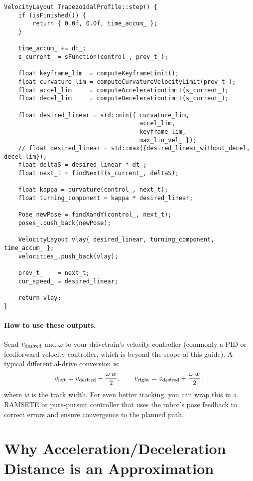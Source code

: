 \documentclass[11pt]{article}
\begin{document}
\begin{lstlisting}
VelocityLayout TrapezoidalProfile::step() {
    if (isFinished()) {
        return { 0.0f, 0.0f, time_accum_ };
    }

    time_accum_ += dt_;
    s_current_ = sFunction(control_, prev_t_);

    float keyframe_lim  = computeKeyframeLimit();
    float curvature_lim = computeCurvatureVelocityLimit(prev_t_);
    float accel_lim     = computeAccelerationLimit(s_current_);
    float decel_lim     = computeDecelerationLimit(s_current_);

    float desired_linear = std::min({ curvature_lim,
                                      accel_lim,
                                      keyframe_lim,
                                      max_lin_vel_ });
    // float desired_linear = std::max({desired_linear_without_decel, decel_lim});
    float deltaS = desired_linear * dt_;
    float next_t = findNextT(s_current_, deltaS);

    float kappa = curvature(control_, next_t);
    float turning_component = kappa * desired_linear;

    Pose newPose = findXandY(control_, next_t);
    poses_.push_back(newPose);

    VelocityLayout vlay{ desired_linear, turning_component, time_accum_ };
    velocities_.push_back(vlay);

    prev_t_    = next_t;
    cur_speed_ = desired_linear;

    return vlay;
}
\end{lstlisting}

\paragraph{How to use these outputs.} Send \(v_{\rm desired}\) and \(\omega\) to your drivetrain’s velocity controller (commonly a PID or feedforward velocity controller, which is beyond the scope of this guide). A typical differential-drive conversion is:
\[
v_{\rm left}  = v_{\rm desired} - \frac{\omega\,w}{2},\qquad
v_{\rm right} = v_{\rm desired} + \frac{\omega\,w}{2}\,,
\] 
where $w$ is the track width. For even better tracking, you can wrap this in a RAMSETE or pure-pursuit controller that uses the robot’s pose feedback to correct errors and ensure convergence to the planned path.

\section{Why Acceleration/Deceleration Distance is an Approximation}
\end{document}
